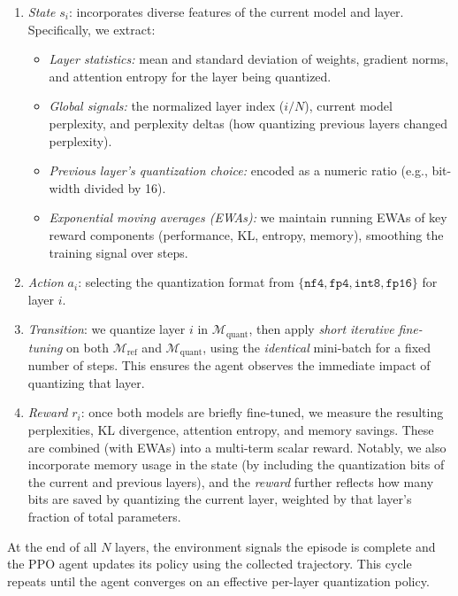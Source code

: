 \documentclass{article}
\begin{document}
	\begin{enumerate}
		\item \textit{State} $s_i$: incorporates diverse features of the current model and layer. Specifically, we extract:
		\begin{itemize}
			\item \emph{Layer statistics:} mean and standard deviation of weights, gradient norms, and attention entropy for the layer being quantized.
			\item \emph{Global signals:} the normalized layer index ($i/N$), current model perplexity, and perplexity deltas (how quantizing previous layers changed perplexity).
			\item \emph{Previous layer's quantization choice:} encoded as a numeric ratio (e.g., bit-width divided by 16).
			\item \emph{Exponential moving averages (EWAs):} we maintain running EWAs of key reward components (performance, KL, entropy, memory), smoothing the training signal over steps.
		\end{itemize}
		
		\item \textit{Action} $a_i$: selecting the quantization format from $\{\texttt{nf4}, \texttt{fp4}, \texttt{int8}, \texttt{fp16}\}$ for layer $i$.
		
		\item \textit{Transition}: we quantize layer $i$ in $\mathcal{M}_{\text{quant}}$, then apply \emph{short iterative fine-tuning} on both $\mathcal{M}_{\text{ref}}$ and $\mathcal{M}_{\text{quant}}$, using the \emph{identical} mini-batch for a fixed number of steps. This ensures the agent observes the immediate impact of quantizing that layer.
		
		\item \textit{Reward} $r_i$: once both models are briefly fine-tuned, we measure the resulting perplexities, KL divergence, attention entropy, and memory savings. These are combined (with EWAs) into a multi-term scalar reward. Notably, we also incorporate memory usage in the state (by including the quantization bits of the current and previous layers), and the \emph{reward} further reflects how many bits are saved by quantizing the current layer, weighted by that layer’s fraction of total parameters.		
	\end{enumerate}
	
	At the end of all $N$ layers, the environment signals the episode is complete and the PPO agent updates its policy using the collected trajectory. This cycle repeats until the agent converges on an effective per-layer quantization policy.
	
\end{document}
